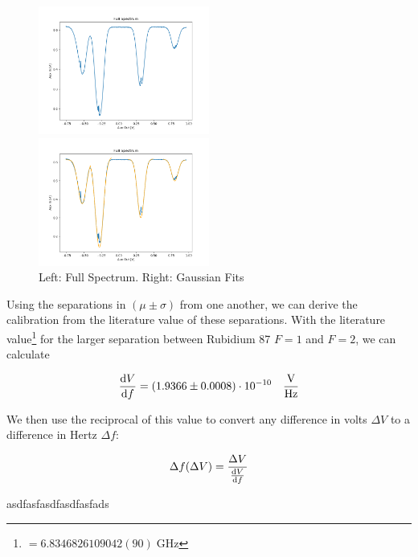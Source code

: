 \documentclass[12pt, a4paper]{article}
\begin{document}
\begin{figure}
    \centering
    \parbox{0.45\textwidth}{
        \includegraphics[width=0.5\textwidth]{fullspectrum.png}
    }
    \hfill
    \parbox{0.45\textwidth}{
        \includegraphics[width=0.5\textwidth]{fullspectrumgaussian}    
    }
    \caption{Left: Full Spectrum. Right: Gaussian Fits}
\end{figure}

Using the separations in $(\mu \pm \sigma)$ from one another, we can derive the calibration from the literature value of these separations. With the literature value\footnote{$= 6.8346826109042(90)\;\si{\giga\hertz}$} for the larger separation between Rubidium 87 $F = 1$ and $F = 2$, we can calculate

\begin{equation}
\dv{V}{f} = (1.9366 \pm 0.0008) \cdot 10^{-10} \quad \si{\frac{\volt}{\hertz}}
\end{equation}

We then use the reciprocal of this value to convert any difference in volts $\Delta V$ to a difference in Hertz $\Delta f$:

\begin{equation}
\Delta f (\Delta V) = \frac{\Delta V}{\dv{V}{f}}
\end{equation}




asdfasfasdfasdfasfads


\newpage
\end{document}
